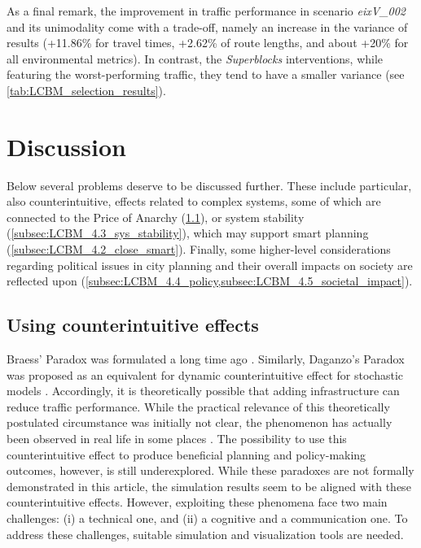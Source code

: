 As a final remark, the improvement in traffic performance in scenario \emph{eixV\_002}  and its unimodality come with a trade-off, namely an increase in the variance of results (+11.86\% for travel times, +2.62\% of route lengths, and about +20\% for all environmental metrics). In contrast, the \emph{Superblocks} interventions, while featuring the worst-performing traffic, they tend to have a smaller variance (see \cref{tab:LCBM_selection_results}).



\section{Discussion}
\label{sec:LCBM_4_discussion}

Below several problems deserve to be discussed further. These include particular, also counterintuitive, effects related to complex systems, some of which are connected to the Price of Anarchy (\cref{subsec:LCBM_4.1_counter_effects}), or system stability (\cref{subsec:LCBM_4.3_sys_stability}), which may support smart planning (\cref{subsec:LCBM_4.2_close_smart}). Finally, some higher-level considerations regarding political issues in city planning and their overall impacts on society are reflected upon (\cref{subsec:LCBM_4.4_policy,subsec:LCBM_4.5_societal_impact}).

\subsection{Using counterintuitive effects}
\label{subsec:LCBM_4.1_counter_effects}

Braess’ Paradox was formulated a long time ago \citep{Braess1969}. Similarly, Daganzo’s Paradox was proposed as an equivalent for dynamic counterintuitive effect for stochastic models \citep{Sheffi1978}. Accordingly, it is theoretically possible that adding infrastructure can reduce traffic performance. While the practical relevance of this theoretically postulated circumstance was initially not clear, the phenomenon has actually been observed in real life in some places \citep{Baker2009,Chung2012,Knodel1969,Kolata1990,Youn.etal.2008,Cairns.etal1998,Cairns2002}. The possibility to use this counterintuitive effect to produce beneficial planning and policy-making outcomes, however, is still underexplored. While these paradoxes are not formally demonstrated in this article, the simulation results seem to be aligned with these counterintuitive effects. However, exploiting these phenomena face two main challenges: (i) a technical one, and (ii) a cognitive and a communication one. To address these challenges, suitable simulation and visualization tools are needed.

